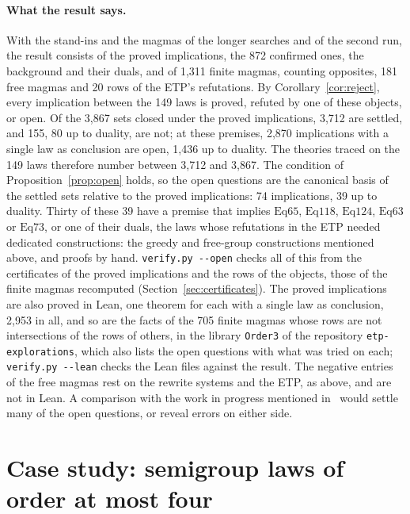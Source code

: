 \documentclass[11pt,a4paper]{article}
\theoremstyle{definition}
\theoremstyle{remark}
\newcommand{\code}[1]{\texttt{#1}}
\newcommand{\Eq}[1]{\mathrm{Eq}#1}
\begin{document}
\paragraph{What the result says.}
With the stand-ins and the magmas of the longer searches and of the second run, the result consists of the proved implications, the 872 confirmed ones, the background and their duals, and of 1,311 finite magmas, counting opposites, 181 free magmas and 20 rows of the ETP's refutations. By Corollary~\ref{cor:reject}, every implication between the 149 laws is proved, refuted by one of these objects, or open. Of the 3,867 sets closed under the proved implications, 3,712 are settled, and 155, 80 up to duality, are not; at these premises, 2,870 implications with a single law as conclusion are open, 1,436 up to duality. The theories traced on the 149 laws therefore number between 3,712 and 3,867. The condition of Proposition~\ref{prop:open} holds, so the open questions are the canonical basis of the settled sets relative to the proved implications: 74 implications, 39 up to duality. Thirty of these 39 have a premise that implies $\Eq{65}$, $\Eq{118}$, $\Eq{124}$, $\Eq{63}$ or $\Eq{73}$, or one of their duals, the laws whose refutations in the ETP needed dedicated constructions: the greedy and free-group constructions mentioned above, and proofs by hand. \code{verify.py -{}-open} checks all of this from the certificates of the proved implications and the rows of the objects, those of the finite magmas recomputed (Section~\ref{sec:certificates}). The proved implications are also proved in Lean, one theorem for each with a single law as conclusion, 2,953 in all, and so are the facts of the 705 finite magmas whose rows are not intersections of the rows of others, in the library \code{Order3} of the repository \code{etp-explorations}, which also lists the open questions with what was tried on each; \code{verify.py -{}-lean} checks the Lean files against the result. The negative entries of the free magmas rest on the rewrite systems and the ETP, as above, and are not in Lean. A comparison with the work in progress mentioned in~\cite{LF26b} would settle many of the open questions, or reveal errors on either side.

\section{Case study: semigroup laws of order at most four}\label{sec:semigroups}
\end{document}
